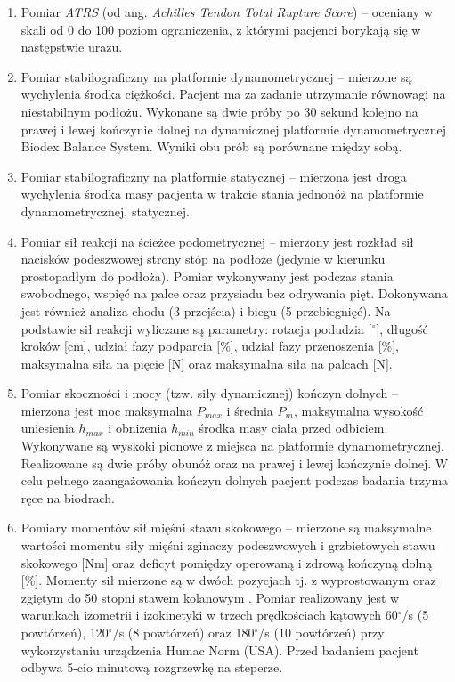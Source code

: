 \begin{enumerate}
	\item Pomiar \textit{ATRS} (od ang. \textit{Achilles Tendon Total Rupture Score}) -- oceniany \linebreak w skali od 0 do 100 \cite{NilssonHelander2007} poziom ograniczenia, z którymi pacjenci borykają się w następstwie urazu.
	\item Pomiar stabilograficzny na platformie dynamometrycznej -- mierzone są wychylenia środka ciężkości. Pacjent ma za zadanie utrzymanie równowagi \linebreak na niestabilnym podłożu. Wykonane są dwie próby po 30 sekund kolejno na prawej i lewej kończynie dolnej na dynamicznej platformie dynamometrycznej Biodex Balance System. Wyniki obu prób są porównane między sobą. 
	\item Pomiar stabilograficzny na platformie statycznej -- mierzona jest droga wychylenia środka masy pacjenta w trakcie stania jednonóż na platformie dynamometrycznej, statycznej.
	\item Pomiar sił reakcji na ścieżce podometrycznej -- mierzony jest rozkład sił nacisków podeszwowej strony stóp na podłoże (jedynie w kierunku prostopadłym do podłoża). Pomiar wykonywany jest podczas stania swobodnego, wspięć \linebreak na palce oraz przysiadu bez odrywania pięt. Dokonywana jest również analiza chodu (3 przejścia) i biegu (5 przebiegnięć). Na podstawie sił reakcji wyliczane są parametry: rotacja podudzia [$^\circ$], długość kroków [cm], udział fazy podparcia [\%], udział fazy przenoszenia [\%], maksymalna siła na pięcie [N] oraz maksymalna siła na palcach [N].
	\item Pomiar skoczności i mocy (tzw. siły dynamicznej) kończyn dolnych -- mierzona jest moc maksymalna $P_{max}$ i średnia $P_m$, maksymalna wysokość uniesienia $h_{max}$ i obniżenia $h_{min}$ środka masy ciała przed odbiciem. Wykonywane są wyskoki pionowe z miejsca na platformie dynamometrycznej. Realizowane są dwie próby obunóż oraz na prawej i lewej kończynie dolnej. W celu pełnego zaangażowania kończyn dolnych pacjent podczas badania trzyma ręce na biodrach. 
	\item Pomiary momentów sił mięśni stawu skokowego -- mierzone są maksymalne wartości momentu siły mięśni zginaczy podeszwowych i grzbietowych stawu skokowego [Nm] oraz deficyt pomiędzy operowaną i zdrową kończyną dolną [\%]. Momenty sił mierzone są w dwóch pozycjach tj. z wyprostowanym oraz zgiętym do 50 stopni stawem kolanowym \cite{Orishimo2008}. Pomiar realizowany jest w warunkach izometrii i izokinetyki w trzech prędkościach kątowych 60$^\circ$/s (5 powtórzeń), 120$^\circ$/s (8 powtórzeń) oraz 180$^\circ$/s (10 powtórzeń) przy wykorzystaniu urządzenia Humac Norm (USA). Przed badaniem pacjent odbywa 5-cio minutową rozgrzewkę na steperze.
\end{enumerate}

